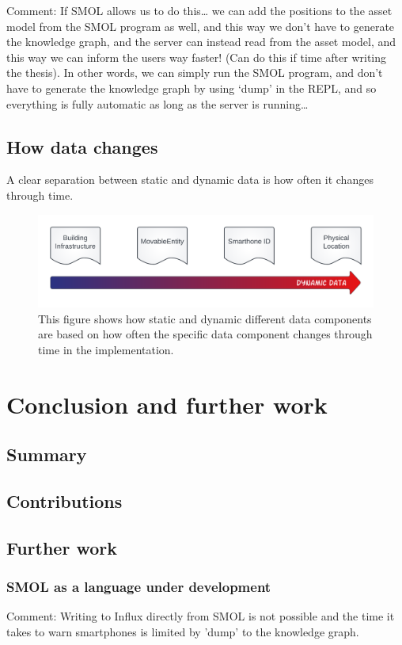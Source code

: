 \documentclass{article}
\begin{document}
Comment: If SMOL allows us to do this… we can add the positions to the asset model from the SMOL program as well, and this way we don't have to generate the knowledge graph, and the server can instead read from the asset model, and this way we can inform the users way faster! (Can do this if time after writing the thesis). In other words, we can simply run the SMOL program, and don’t have to generate the knowledge graph by using ‘dump’ in the REPL, and so everything is fully automatic as long as the server is running…

\subsection{How data changes}
A clear separation between static and dynamic data is how often it changes through time. 

\begin{figure}
    \centering
    \includegraphics[scale=0.16]{graphics/dynamic_arrow.png}
    \caption{This figure shows how static and dynamic different data components are based on how often the specific data component changes through time in the implementation.}
    \label{fig:my_label}
\end{figure}


\newpage
\section{Conclusion and further work}\label{sec:Conclusion}
\subsection{Summary}
\subsection{Contributions}
\subsection{Further work}
\subsubsection{SMOL as a language under development}
Comment: Writing to Influx directly from SMOL is not possible and the time it takes to warn smartphones is limited by 'dump' to the knowledge graph.
\end{document}

